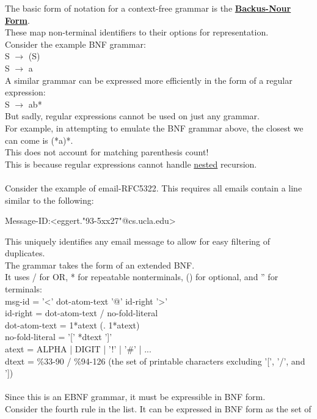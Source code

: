 \documentclass[../../lecture_notes.tex]{subfiles}
\begin{document}
\noindent The basic form of notation for a context-free grammar is the \textbf{\underline{Backus-Nour Form}}.\\
These map non-terminal identifiers to their options for representation.\\
Consider the example BNF grammar:\\
\indent S $\rightarrow$ (S)\\
\indent S $\rightarrow$ a\\
A similar grammar can be expressed more efficiently in the form of a regular expression:\\
\indent S $\rightarrow$ ab*\\
But sadly, regular expressions cannot be used on just any grammar.\\
For example, in attempting to emulate the BNF grammar above, the closest we can come is (*a)*.\\
This does not account for matching parenthesis count!\\
This is because regular expressions cannot handle \underline{nested} recursion.\\
\\
Consider the example of email-RFC5322.  This requires all emails contain a line similar to the following:
\begin{center} Message-ID:<eggert."93-5xx27"@cs.ucla.edu> \end{center}
This uniquely identifies any email message to allow for easy filtering of duplicates.\\
The grammar takes the form of an extended BNF.\\
It uses / for OR, * for repeatable nonterminals, () for optional, and '' for terminals:\\
\indent msg-id = '<' dot-atom-text '@' id-right '>'\\
\indent id-right = dot-atom-text / no-fold-literal\\
\indent dot-atom-text = 1*atext (. 1*atext)\\
\indent no-fold-literal = '[' *dtext ']'\\
\indent atext = ALPHA | DIGIT | '!' | '\#' | ...\\
\indent dtext = \%33-90 / \%94-126 (the set of printable characters excluding '[', '/', and '])\\
\\
Since this is an EBNF grammar, it must be expressible in BNF form.\\
Consider the fourth rule in the list.  It can be expressed in BNF form as the set of\\
\end{document}
